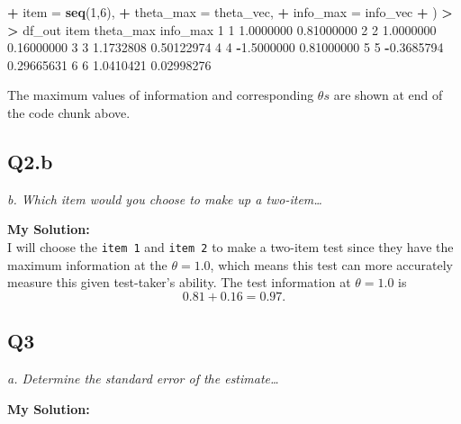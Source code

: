 \documentclass[
]{article}
\newenvironment{Shaded}{\begin{snugshade}}{\end{snugshade}}
\newcommand{\AttributeTok}[1]{\textcolor[rgb]{0.13,0.29,0.53}{#1}}
\newcommand{\DecValTok}[1]{\textcolor[rgb]{0.00,0.00,0.81}{#1}}
\newcommand{\ErrorTok}[1]{\textcolor[rgb]{0.64,0.00,0.00}{\textbf{#1}}}
\newcommand{\FloatTok}[1]{\textcolor[rgb]{0.00,0.00,0.81}{#1}}
\newcommand{\FunctionTok}[1]{\textcolor[rgb]{0.13,0.29,0.53}{\textbf{#1}}}
\newcommand{\NormalTok}[1]{#1}
\newcommand{\SpecialCharTok}[1]{\textcolor[rgb]{0.81,0.36,0.00}{\textbf{#1}}}
\begin{document}
\begin{Shaded}
\begin{Highlighting}[]
\SpecialCharTok{+}   \AttributeTok{item =} \FunctionTok{seq}\NormalTok{(}\DecValTok{1}\NormalTok{,}\DecValTok{6}\NormalTok{),}
\SpecialCharTok{+}   \AttributeTok{theta\_max =}\NormalTok{ theta\_vec,}
\SpecialCharTok{+}   \AttributeTok{info\_max =}\NormalTok{ info\_vec}
\SpecialCharTok{+}\NormalTok{ )}
\SpecialCharTok{\textgreater{}} 
\ErrorTok{\textgreater{}}\NormalTok{ df\_out}
\NormalTok{  item  theta\_max   info\_max}
\DecValTok{1}    \DecValTok{1}  \FloatTok{1.0000000} \FloatTok{0.81000000}
\DecValTok{2}    \DecValTok{2}  \FloatTok{1.0000000} \FloatTok{0.16000000}
\DecValTok{3}    \DecValTok{3}  \FloatTok{1.1732808} \FloatTok{0.50122974}
\DecValTok{4}    \DecValTok{4} \SpecialCharTok{{-}}\FloatTok{1.5000000} \FloatTok{0.81000000}
\DecValTok{5}    \DecValTok{5} \SpecialCharTok{{-}}\FloatTok{0.3685794} \FloatTok{0.29665631}
\DecValTok{6}    \DecValTok{6}  \FloatTok{1.0410421} \FloatTok{0.02998276}
\end{Highlighting}
\end{Shaded}

The maximum values of information and corresponding \(\theta s\) are
shown at end of the code chunk above.

\hypertarget{q2.b}{%
\subsection{Q2.b}\label{q2.b}}

\emph{b. Which item would you choose to make up a two-item\ldots{}}

\textbf{My Solution:}\\
I will choose the \texttt{item\ 1} and \texttt{item\ 2} to make a
two-item test since they have the maximum information at the
\(\theta = 1.0\), which means this test can more accurately measure this
given test-taker's ability. The test information at \(\theta = 1.0\) is
\[0.81+0.16=0.97.\]

\hypertarget{q3}{%
\subsection{Q3}\label{q3}}

\emph{a. Determine the standard error of the estimate\ldots{}}

\textbf{My Solution:}
\end{document}
